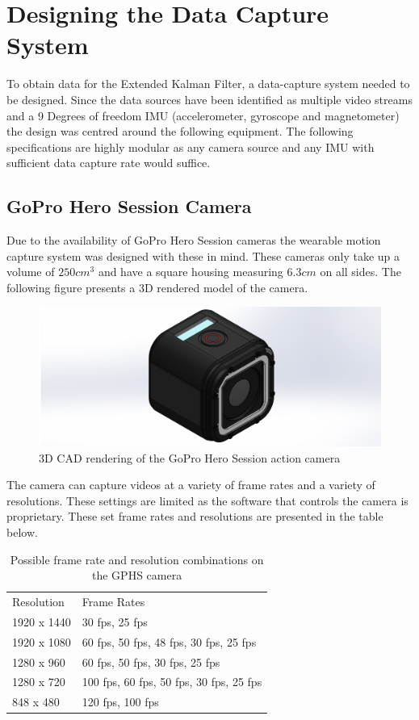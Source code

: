 \chapter{Designing the Data Capture System}
To obtain data for the Extended Kalman Filter, a data-capture system needed to be designed. Since the data sources have been identified as multiple video streams and a 9 Degrees of freedom IMU (accelerometer, gyroscope and magnetometer) the design was centred around the following equipment. The following specifications are highly modular as any camera source and any IMU with sufficient data capture rate would suffice. 

\section{GoPro Hero Session Camera}
Due to the availability of GoPro Hero Session cameras the wearable motion capture system was designed with these in mind. These cameras only take up a volume of $250cm^3$ and have a square housing measuring $6.3cm$ on all sides. The following figure presents a 3D rendered model of the camera.

\begin{figure}[!ht] 
\captionsetup{width=\linewidth, font=small}  
\includegraphics[width=\linewidth]{figures/GoProHero4Session.JPG}
\caption{3D CAD rendering of the GoPro Hero Session action camera}
\label{fig:GoProHero4Session}
\end{figure}

The camera can capture videos at a variety of frame rates and a variety of resolutions. These settings are limited as the software that controls the camera is proprietary. These set frame rates and resolutions are presented in the table below.

\begin{table}[!ht]
\centering
\caption{Possible frame rate and resolution combinations on the GPHS camera}
\label{framesres}
\begin{tabular}{ll}
Resolution  & Frame Rates                             \\
1920 x 1440 & 30 fps, 25 fps                          \\
1920 x 1080 & 60 fps, 50 fps, 48 fps, 30 fps, 25 fps  \\
1280 x 960  & 60 fps, 50 fps, 30 fps, 25 fps          \\
1280 x 720  & 100 fps, 60 fps, 50 fps, 30 fps, 25 fps \\
848 x 480   & 120 fps, 100 fps                       
\end{tabular}
\end{table}

